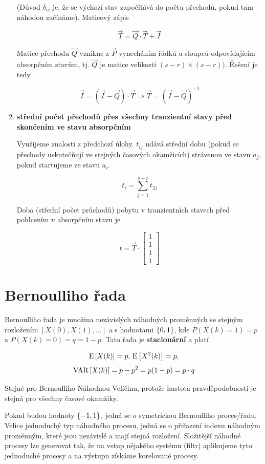 \begin{enumerate}[label=\arabic*)]
	(Důvod $\delta_{ij}$ je, že se výchozí stav započítává do počtu přechodů, pokud tam náhodou začínáme). Maticový zápis

	\[ \vec{T} = \vec{Q}\cdot\vec{T}+\vec{I} \]

	Matice přechodu $\vec{Q}$ vznikne z $\vec{P}$ vynecháním řádků a sloupců odpovídajícím absorpčním stavům, tj. $\vec{Q}$ je matice velikosti $(s-r) \times (s-r))$. Řešení je tedy

	\[ \vec{I}=(\vec{I}-\vec{Q})\cdot\vec{T}\Rightarrow \vec{T}=(\vec{I}-\vec{Q})^{-1} \]

\item \textbf{střední počet přechodů přes všechny tranzientní stavy před skončením ve stavu absorpčním}\br

	Využijeme znalosti z předchozí úlohy. $t_{ij}$ udává střední dobu (pokud se přechody uskutečňují ve stejných časových okamžicích) strávenou ve stavu $a_j$, pokud startujeme ze stavu $a_i$.

	\[ t_i=\sum_{j=1}^{s-r}t_{2j} \]

	Doba (střední počet průchodů) pobytu v tranzientních stavech před pohlcením v absorpčním stavu je

	\[ t = \vec{T}\cdot
	\begin{bmatrix}
	1\\1\\1\\1
	\end{bmatrix}
	\]
\end{enumerate}

\section{Bernoulliho řada}
Bernoulliho řada je množina nezávislých náhodných proměnných se stejným rozložením $[X(0),X(1),\ldots]$ a s hodnotami $\left\{0,1\right\}$, kde $P(X(k)=1)=p$ a $P(X(k)=0)=q=1-p$. Tato řada je \textbf{stacionární} a platí

\[ \,\mathrm{E}\left[X(k)\right]=p,\,\mathrm{E}\left[X^2(k)\right]=p, \]
\[ \,\mathrm{VAR}\left[X(k)\right]=p-p^2=p(1-p)=p\cdot q  \]

Stejné pro Bernoulliho Náhodnou Veličinu, protože hustota pravděpodobnosti je stejná pro všechny časové okamžiky.

Pokud budou hodnoty $\left\{-1,1\right\}$, jedná se o symetrickou Bernoulliho proces/řadu. Velice jednoduchý typ náhodného procesu, jedná se o přiřazení indexu náhodným proměnným, které jsou nezávislé a mají stejná rozložení. Složitější náhodné procesy lze generovat tak, že na vstup nějakého systému (filtr) aplikujeme tyto jednoduché procesy a na výstupu získáme korelované procesy.

